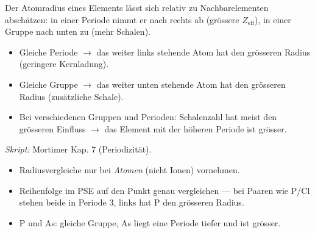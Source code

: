 
Der Atomradius eines Elements lässt sich relativ zu Nachbarelementen abschätzen:
in einer Periode nimmt er nach rechts ab (grössere $Z_{\mathrm{eff}}$), in einer
Gruppe nach unten zu (mehr Schalen).

\begin{werkzeugkasten}
\begin{itemize}
  \item Gleiche Periode $\to$ das weiter links stehende Atom hat den grösseren
        Radius (geringere Kernladung).
  \item Gleiche Gruppe $\to$ das weiter unten stehende Atom hat den grösseren
        Radius (zusätzliche Schale).
  \item Bei verschiedenen Gruppen und Perioden: Schalenzahl hat meist den
        grösseren Einfluss $\to$ das Element mit der höheren Periode ist grösser.
\end{itemize}
\textit{Skript:} Mortimer Kap. 7 (Periodizität).
\end{werkzeugkasten}

\begin{achtung}
\begin{itemize}
  \item Radiusvergleiche nur bei \textit{Atomen} (nicht Ionen) vornehmen.
  \item Reihenfolge im PSE auf den Punkt genau vergleichen --- bei Paaren wie
        P/Cl stehen beide in Periode 3, links hat P den grösseren Radius.
  \item P und As: gleiche Gruppe, As liegt eine Periode tiefer und ist grösser.
\end{itemize}
\end{achtung}
